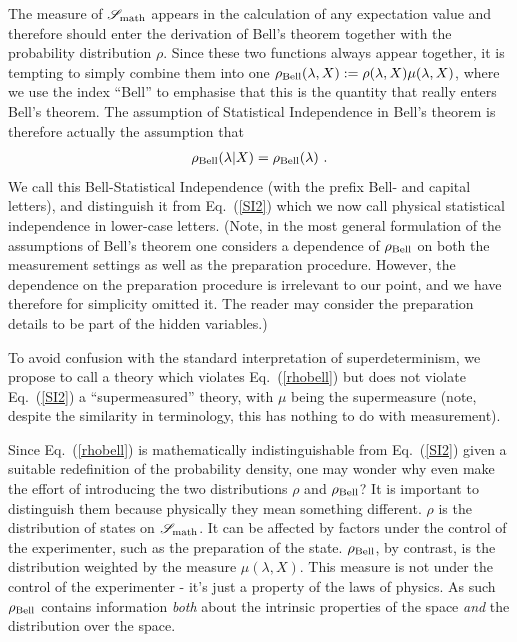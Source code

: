 \documentclass{article}
\begin{document}
The measure of ${\mathscr S}_{\rm math}$ appears in the calculation of any expectation value and therefore should enter the derivation of Bell's theorem together with the probability distribution $\rho$. Since these two functions always appear together, it is tempting to simply combine them into one $\rho_{\rm Bell} (\lambda,X) := \rho(\lambda,X)\mu(\lambda,X)$, where we use the index ``Bell'' to emphasise that this is the quantity that {really} enters Bell's theorem. 
The assumption of Statistical Independence in Bell's theorem is therefore actually the assumption that
\begin{eqnarray}
\rho_{\rm Bell} (\lambda | X) = \rho_{\rm Bell} (\lambda)~. \label{rhobell}
\end{eqnarray}
We call this Bell-Statistical Independence (with the prefix Bell- and capital letters), and distinguish it from Eq.\ (\ref{SI2}) which we now call physical statistical independence in lower-case letters. (Note, in the most general formulation of the assumptions of Bell's theorem one considers a dependence of $\rho_{\rm Bell}$ on both the measurement settings as well as the preparation procedure. However, the dependence on the preparation procedure is irrelevant to our point, and we have therefore for simplicity omitted it. The reader may consider the preparation details to be part of the hidden variables.)

To avoid confusion with the standard interpretation of superdeterminism, we propose to call a theory which violates Eq.\ (\ref{rhobell}) but does not violate Eq.\ (\ref{SI2}) a ``supermeasured'' theory, with $\mu$ being the supermeasure (note, despite the similarity in terminology, this has nothing to do with measurement).


Since Eq.\ (\ref{rhobell}) is mathematically indistinguishable from Eq.\ (\ref{SI2}) given a suitable redefinition of the probability density, one may wonder why even make the effort of introducing the two distributions $\rho$ and $\rho_{\rm Bell}$? It is important to distinguish them because physically they mean something different. $\rho$ is the distribution of states on ${\mathscr S}_{\rm math}$. It can be affected by factors under the control of the experimenter, such as the preparation of the state. $\rho_{\rm Bell}$, by contrast, is the distribution weighted by the measure $\mu(\lambda, X)$. This measure is not under the control of the experimenter - it's just a property of the laws of physics. As such $\rho_{\rm Bell}$ contains information \emph{both} about the intrinsic properties of the space \emph{and} the distribution over the space. 
\end{document}
